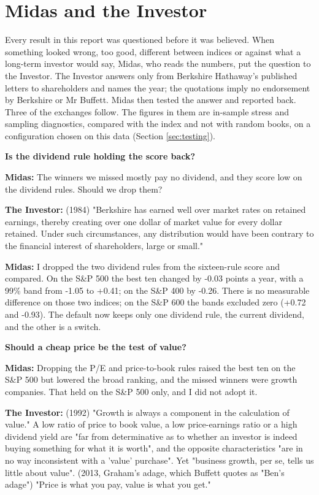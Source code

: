 \documentclass[11pt,a4paper]{article}
\begin{document}
\section{Midas and the Investor}
\label{sec:dialogue}
Every result in this report was questioned before it was believed. When something looked wrong, too good, different between indices or against what a long-term investor would say, Midas, who reads the numbers, put the question to the Investor. The Investor answers only from Berkshire Hathaway's published letters to shareholders and names the year; the quotations imply no endorsement by Berkshire or Mr Buffett. Midas then tested the answer and reported back. Three of the exchanges follow. The figures in them are in-sample stress and sampling diagnostics, compared with the index and not with random books, on a configuration chosen on this data (Section \ref{sec:testing}).

\textbf{Is the dividend rule holding the score back?}

\textbf{Midas:} The winners we missed mostly pay no dividend, and they score low on the dividend rules. Should we drop them?

\textbf{The Investor:} (1984) "Berkshire has earned well over market rates on retained earnings, thereby creating over one dollar of market value for every dollar retained. Under such circumstances, any distribution would have been contrary to the financial interest of shareholders, large or small."

\textbf{Midas:} I dropped the two dividend rules from the sixteen-rule score and compared. On the S\&P 500 the best ten changed by -0.03 points a year, with a 99\% band from -1.05 to +0.41; on the S\&P 400 by -0.26. There is no measurable difference on those two indices; on the S\&P 600 the bands excluded zero (+0.72 and -0.93). The default now keeps only one dividend rule, the current dividend, and the other is a switch.

\textbf{Should a cheap price be the test of value?}

\textbf{Midas:} Dropping the P/E and price-to-book rules raised the best ten on the S\&P 500 but lowered the broad ranking, and the missed winners were growth companies. That held on the S\&P 500 only, and I did not adopt it.

\textbf{The Investor:} (1992) "Growth is always a component in the calculation of value." A low ratio of price to book value, a low price-earnings ratio or a high dividend yield are "far from determinative as to whether an investor is indeed buying something for what it is worth", and the opposite characteristics "are in no way inconsistent with a 'value' purchase". Yet "business growth, per se, tells us little about value". (2013, Graham's adage, which Buffett quotes as "Ben's adage") "Price is what you pay, value is what you get."
\end{document}
